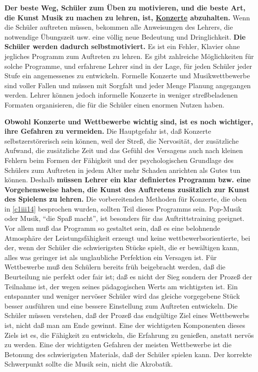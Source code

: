 \textbf{Der beste Weg, Schüler zum Üben zu motivieren, und die beste Art, die Kunst Musik zu machen zu lehren, ist, \hyperref[c1iii14]{Konzerte} abzuhalten.}
Wenn die Schüler auftreten müssen, bekommen alle Anweisungen des Lehrers, die notwendige Übungszeit usw. eine völlig neue Bedeutung und Dringlichkeit.
\textbf{Die Schüler werden dadurch selbstmotiviert.}
Es ist ein Fehler, Klavier ohne jegliches Programm zum Auftreten zu lehren.
Es gibt zahlreiche Möglichkeiten für solche Programme, und erfahrene Lehrer sind in der Lage, für jeden Schüler jeder Stufe ein angemessenes zu entwickeln.
Formelle Konzerte und Musikwettbewerbe sind voller Fallen und müssen mit Sorgfalt und jeder Menge Planung angegangen werden.
Lehrer können jedoch informelle Konzerte in weniger streßbeladenen Formaten organisieren, die für die Schüler einen enormen Nutzen haben.

\textbf{Obwohl Konzerte und Wettbewerbe wichtig sind, ist es noch wichtiger, ihre Gefahren zu vermeiden.}
Die Hauptgefahr ist, daß Konzerte selbstzerstörerisch sein können, weil der Streß, die Nervosität, der zusätzliche Aufwand, die zusätzliche Zeit und das Gefühl des Versagens auch nach kleinen Fehlern beim Formen der Fähigkeit und der psychologischen Grundlage des Schülers zum Auftreten in jedem Alter mehr Schaden anrichten als Gutes tun können.
Deshalb \textbf{müssen Lehrer ein klar definiertes Programm bzw. eine Vorgehensweise haben, die Kunst des Auftretens zusätzlich zur Kunst des Spielens zu lehren.}
Die vorbereitenden Methoden für Konzerte, die oben in \hyperref[c1iii14]{\autoref{c1iii14}} besprochen wurden, sollten Teil dieses Programms sein.
Pop-Musik oder Musik, \enquote{die Spaß macht}, ist besonders für das Auftrittstraining geeignet.
Vor allem muß das Programm so gestaltet sein, daß es eine belohnende Atmosphäre der Leistungsfähigkeit erzeugt und keine wettbewerbsorientierte, bei der, wenn der Schüler die schwierigsten Stücke spielt, die er bewältigen kann, alles was geringer ist als unglaubliche Perfektion ein Versagen ist.
Für Wettbewerbe muß den Schülern bereits früh beigebracht werden, daß die Beurteilung nie perfekt oder fair ist; daß es nicht der Sieg sondern der Prozeß der Teilnahme ist, der wegen seines pädagogischen Werts am wichtigsten ist.
Ein entspannter und weniger nervöser Schüler wird das gleiche vorgegebene Stück besser ausführen und eine bessere Einstellung zum Auftreten entwickeln.
Die Schüler müssen verstehen, daß der Prozeß das endgültige Ziel eines Wettbewerbs ist, nicht daß man am Ende gewinnt.
Eine der wichtigsten Komponenten dieses Ziels ist es, die Fähigkeit zu entwickeln, die Erfahrung zu genießen, anstatt nervös zu werden.
Eine der wichtigsten Gefahren der meisten Wettbewerbe ist die Betonung des schwierigsten Materials, daß der Schüler spielen kann.
Der korrekte Schwerpunkt sollte die Musik sein, nicht die Akrobatik.

